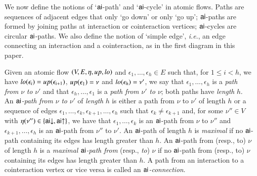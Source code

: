 We now define the notions of `$\mathsf{ai}$-path' and `$\mathsf{ai}$-cycle' in atomic flows. Paths are sequences of adjacent edges that only `go down' or only `go up'; $\mathsf{ai}$-paths are formed by joining paths at interaction or cointeraction vertices; $\mathsf{ai}$-cycles are circular $\mathsf{ai}$-paths. We also define the notion of `simple edge', \emph{i.e.}, an edge connecting an interaction and a cointeraction, as in the first diagram in this paper.

\begin{definition}
Given an atomic flow $(V,E,\eta,{\mathit up},{\mathit lo})$ and $\epsilon_1,\dots,\epsilon_h\in E$ such that, for $1\le i<h$, we have ${\mathit lo}(\epsilon_i)={\mathit up}(\epsilon_{i+1})$, ${\mathit up}(\epsilon_1)=\nu$ and ${\mathit lo}(\epsilon_h)=\nu'$, we say that $\epsilon_1,\dots,\epsilon_h$ is a \emph{path from $\nu$ to $\nu'$} and that $\epsilon_h,\dots,\epsilon_1$ is a \emph{path from $\nu'$ to $\nu$}; both paths have \emph{length} $h$. An \emph{$\mathsf{ai}$-path from $\nu$ to $\nu'$} of \emph{length} $h$ is either a path from $\nu$ to $\nu'$ of length $h$ or a sequence of edges $\epsilon_1,\dots,\epsilon_k,\epsilon_{k+1},\dots,\epsilon_h$ such that $\epsilon_k \ne \epsilon_{k+1}$ and, for some $\nu''\in V$ with $\eta(\nu'')\in\{\mathsf{ai}{\downarrow},\mathsf{ai}{\uparrow}\}$, we have that $\epsilon_1,\dots,\epsilon_k$ is an $\mathsf{ai}$-path from $\nu$ to $\nu''$ and $\epsilon_{k+1},\dots,\epsilon_h$ is an $\mathsf{ai}$-path from $\nu''$ to $\nu'$. An $\mathsf{ai}$-path of length $h$ is \emph{maximal} if no $\mathsf{ai}$-path containing its edges has length greater than $h$. An $\mathsf{ai}$-path from (resp., to) $\nu$ of length $h$ is a \emph{maximal\/ $\mathsf{ai}$-path from} (resp., \emph{to}) $\nu$ if no $\mathsf{ai}$-path from (resp., to) $\nu$ containing its edges has length greater than $h$. A path from an interaction to a cointeraction vertex or vice versa is called an \emph{$\mathsf{ai}$-connection}.
\end{definition}

